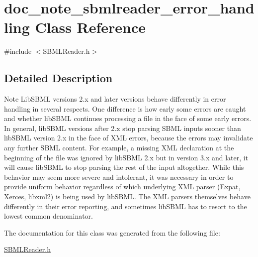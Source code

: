 \hypertarget{classdoc__note__sbmlreader__error__handling}{}\section{doc\+\_\+note\+\_\+sbmlreader\+\_\+error\+\_\+handling Class Reference}
\label{classdoc__note__sbmlreader__error__handling}


{\ttfamily \#include $<$S\+B\+M\+L\+Reader.\+h$>$}



\subsection{Detailed Description}
\begin{DoxyNote}{Note}
Lib\+S\+B\+ML versions 2.\+x and later versions behave differently in error handling in several respects. One difference is how early some errors are caught and whether lib\+S\+B\+ML continues processing a file in the face of some early errors. In general, lib\+S\+B\+ML versions after 2.\+x stop parsing S\+B\+ML inputs sooner than lib\+S\+B\+ML version 2.\+x in the face of X\+ML errors, because the errors may invalidate any further S\+B\+ML content. For example, a missing X\+ML declaration at the beginning of the file was ignored by lib\+S\+B\+ML 2.\+x but in version 3.\+x and later, it will cause lib\+S\+B\+ML to stop parsing the rest of the input altogether. While this behavior may seem more severe and intolerant, it was necessary in order to provide uniform behavior regardless of which underlying X\+ML parser (Expat, Xerces, libxml2) is being used by lib\+S\+B\+ML. The X\+ML parsers themselves behave differently in their error reporting, and sometimes lib\+S\+B\+ML has to resort to the lowest common denominator. 
\end{DoxyNote}


The documentation for this class was generated from the following file\+:\begin{DoxyCompactItemize}
\item 
\hyperlink{_s_b_m_l_reader_8h}{S\+B\+M\+L\+Reader.\+h}\end{DoxyCompactItemize}
